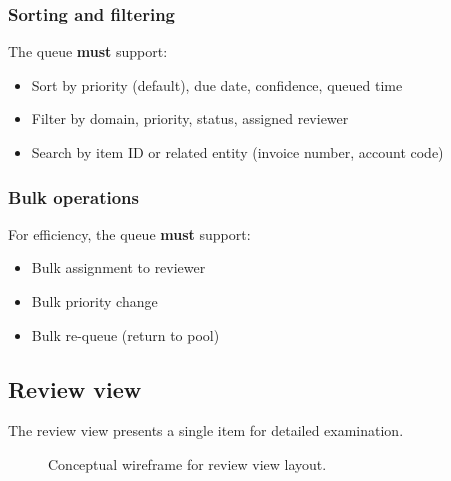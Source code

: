 \subsubsection{Sorting and filtering}

The queue \textbf{must} support:
\begin{itemize}
  \item Sort by priority (default), due date, confidence, queued time
  \item Filter by domain, priority, status, assigned reviewer
  \item Search by item ID or related entity (invoice number, account code)
\end{itemize}

\subsubsection{Bulk operations}

For efficiency, the queue \textbf{must} support:
\begin{itemize}
  \item Bulk assignment to reviewer
  \item Bulk priority change
  \item Bulk re-queue (return to pool)
\end{itemize}

\subsection{Review view}

The review view presents a single item for detailed examination.

\begin{figure}[htbp]
\centering
{}
\caption{Conceptual wireframe for review view layout.}
\label{fig:review-wireframe}
\end{figure}

